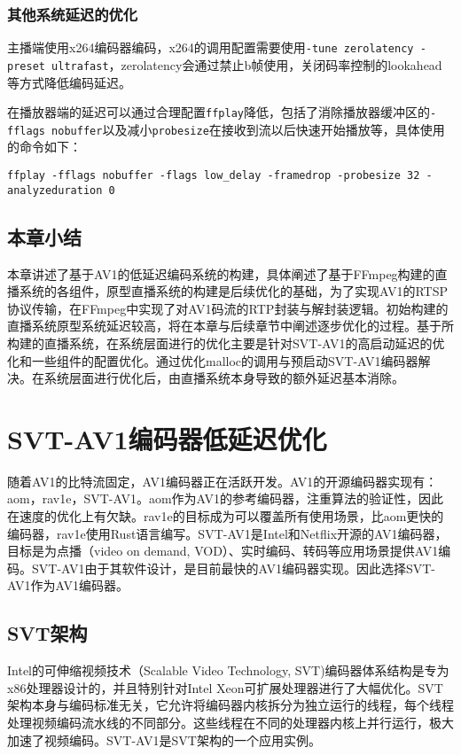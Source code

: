 	\subsection{其他系统延迟的优化}

	主播端使用x264编码器编码，x264的调用配置需要使用\texttt{-tune zerolatency -preset ultrafast}，zerolatency会通过禁止b帧使用，关闭码率控制的lookahead等方式降低编码延迟。

	在播放器端的延迟可以通过合理配置\texttt{ffplay}降低，包括了消除播放器缓冲区的\texttt{-fflags nobuffer}以及减小\texttt{probesize}在接收到流以后快速开始播放等，具体使用的命令如下：

	\texttt{ffplay -fflags nobuffer -flags low\_delay -framedrop -probesize 32 -analyzeduration 0}
\section{本章小结}
  本章讲述了基于AV1的低延迟编码系统的构建，具体阐述了基于FFmpeg构建的直播系统的各组件，原型直播系统的构建是后续优化的基础，为了实现AV1的RTSP协议传输，在FFmpeg中实现了对AV1码流的RTP封装与解封装逻辑。初始构建的直播系统原型系统延迟较高，将在本章与后续章节中阐述逐步优化的过程。基于所构建的直播系统，在系统层面进行的优化主要是针对SVT-AV1的高启动延迟的优化和一些组件的配置优化。通过优化malloc的调用与预启动SVT-AV1编码器解决。在系统层面进行优化后，由直播系统本身导致的额外延迟基本消除。


\chapter{SVT-AV1编码器低延迟优化}
随着AV1的比特流固定，AV1编码器正在活跃开发。AV1的开源编码器实现有：aom\cite{AV1SourceCode2020}，rav1e\cite{barbatoRustAV1Encoder2019}，SVT-AV1\cite{ScalableVideoTechnology2020}。aom作为AV1的参考编码器，注重算法的验证性，因此在速度的优化上有欠缺。rav1e的目标成为可以覆盖所有使用场景，比aom更快的编码器，rav1e使用Rust语言编写。SVT-AV1是Intel和Netflix开源的AV1编码器，目标是为点播（video on demand, VOD）、实时编码、转码等应用场景提供AV1编码。SVT-AV1由于其软件设计，是目前最快的AV1编码器实现。因此选择SVT-AV1作为AV1编码器。
\section{SVT架构}
  Intel的可伸缩视频技术（Scalable Video Technology, SVT\cite{ScalableVideoTechnology2019})编码器体系结构是专为x86处理器设计的，并且特别针对Intel Xeon可扩展处理器进行了大幅优化。SVT架构本身与编码标准无关，它允许将编码器内核拆分为独立运行的线程，每个线程处理视频编码流水线的不同部分。这些线程在不同的处理器内核上并行运行，极大加速了视频编码。SVT-AV1是SVT架构的一个应用实例。

